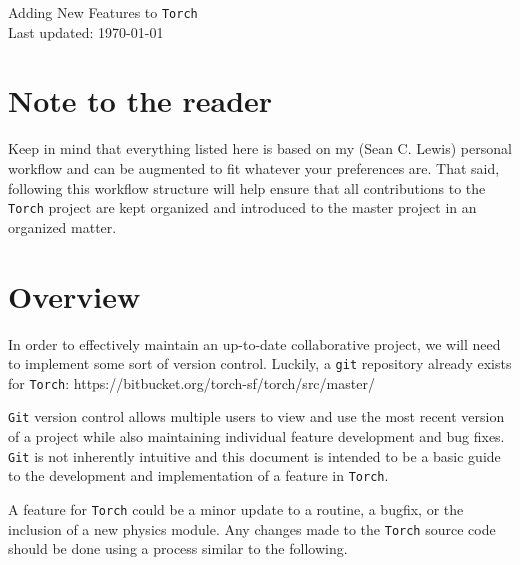 \documentclass[10pt]{article}
\begin{document}
\begin{center}
Adding New Features to \texttt{Torch} \\
Last updated: \today \\
\end{center}





\section{Note to the reader}
Keep in mind that everything listed here is based on my (Sean C. Lewis) personal workflow and can be augmented to fit whatever your preferences are.
That said, following this workflow structure will help ensure that all contributions to the \texttt{Torch} project are kept organized and introduced to the master project in an organized matter.

\section{Overview}
In order to effectively maintain an up-to-date collaborative project, we will need to implement some sort of version control. Luckily, a \texttt{git} repository already exists for \texttt{Torch}: https://bitbucket.org/torch-sf/torch/src/master/

\texttt{Git} version control allows multiple users to view and use the most recent version of a project while also maintaining individual feature development and bug fixes. \texttt{Git} is not inherently intuitive and this document is intended to be a basic guide to the development and implementation of a feature in \texttt{Torch}.

A feature for \texttt{Torch} could be a minor update to a routine, a bugfix, or the inclusion of a new physics module. Any changes made to the \texttt{Torch} source code should be done using a process similar to the following.
\end{document}
